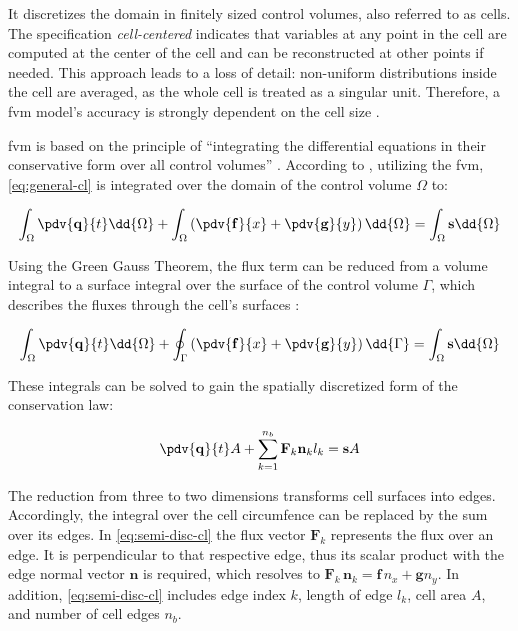 It discretizes the domain in finitely sized control volumes, also referred to as cells.
The specification \emph{cell-centered} indicates that variables at any point in the cell are computed at the center of the cell and can be reconstructed at other points if needed.
This approach leads to a loss of detail: non-uniform distributions inside the cell are averaged, as the whole cell is treated as a singular unit.
Therefore, a \gls{fvm} model's accuracy is strongly dependent on the cell size
\autocite{simons2020}.

\gls{fvm} is based on the principle of ``integrating the differential equations in their conservative form over all control volumes'' \autocite{hinkelmann2005}.
According to \textcite{simons2020}, utilizing the \gls{fvm}, \autoref{eq:general-cl} is integrated over the domain of the control volume $\Omega$ to:

\begin{equation}\label{eq:int-general-cl}
	\int_\Omega \pdv{\mathbf{q}}{t} \dd{\Omega}
	+ \int_\Omega \left(\pdv{\mathbf{f}}{x} + \pdv{\mathbf{g}}{y}\right) \dd{\Omega}
	= \int_\Omega \mathbf{s} \dd{\Omega}
\end{equation}

Using the Green Gauss Theorem, the flux term can be reduced from a volume integral to a surface integral over the surface of the control volume $\Gamma$, which describes the fluxes through the cell's surfaces \autocite{simons2020}:

\begin{equation}
	\int_\Omega \pdv{\mathbf{q}}{t} \dd{\Omega}
	+ \oint_\Gamma \left(\pdv{\mathbf{f}}{x} + \pdv{\mathbf{g}}{y}\right) \dd{\Gamma}
	= \int_\Omega \mathbf{s} \dd{\Omega}
\end{equation}

These integrals can be solved to gain the spatially discretized form of the conservation law:

\begin{equation}\label{eq:semi-disc-cl}
	\pdv{\mathbf{q}}{t} A
	+ \sum_{k=1}^{n_b} \mathbf{F}_k \mathbf{n}_k l_k
	= \mathbf{s} A
\end{equation}

The reduction from three to two dimensions transforms cell surfaces into edges. 
Accordingly, the integral over the cell circumfence can be replaced by the sum over its edges.
In \autoref{eq:semi-disc-cl} the flux vector $\mathbf{F}_k$ represents the flux over an edge. 
It is perpendicular to that respective edge, thus its scalar product with the edge normal vector $\mathbf{n}$ is required, which resolves to $\mathbf{F}_k \, \mathbf{n}_k = \mathbf{f}\, n_x + \mathbf{g} n_y$.
In addition, \autoref{eq:semi-disc-cl} includes
edge index $k$,
length of edge $l_k$,
cell area $A$, and
number of cell edges $n_b$.

